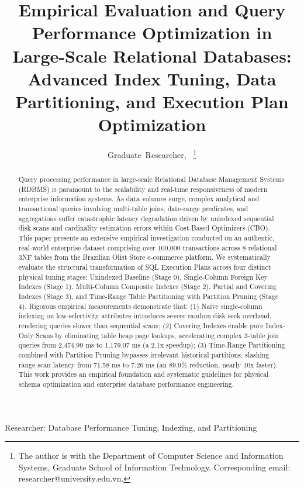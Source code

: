 \documentclass[journal]{IEEEtran}
\begin{document}
\title{Empirical Evaluation and Query Performance Optimization in Large-Scale Relational Databases: Advanced Index Tuning, Data Partitioning, and Execution Plan Optimization}

\author{Graduate~Researcher,~
\thanks{The author is with the Department of Computer Science and Information Systems, Graduate School of Information Technology. Corresponding email: researcher@university.edu.vn.}
}

%
{Researcher: Database Performance Tuning, Indexing, and Partitioning}

\maketitle

\begin{abstract}
Query processing performance in large-scale Relational Database Management Systems (RDBMS) is paramount to the scalability and real-time responsiveness of modern enterprise information systems. As data volumes surge, complex analytical and transactional queries involving multi-table joins, date-range predicates, and aggregations suffer catastrophic latency degradation driven by unindexed sequential disk scans and cardinality estimation errors within Cost-Based Optimizers (CBO). This paper presents an extensive empirical investigation conducted on an authentic, real-world enterprise dataset comprising over 100,000 transactions across 8 relational 3NF tables from the Brazilian Olist Store e-commerce platform. We systematically evaluate the structural transformation of SQL Execution Plans across four distinct physical tuning stages: Unindexed Baseline (Stage 0), Single-Column Foreign Key Indexes (Stage 1), Multi-Column Composite Indexes (Stage 2), Partial and Covering Indexes (Stage 3), and Time-Range Table Partitioning with Partition Pruning (Stage 4). Rigorous empirical measurements demonstrate that: (1) Naive single-column indexing on low-selectivity attributes introduces severe random disk seek overhead, rendering queries slower than sequential scans; (2) Covering Indexes enable pure Index-Only Scans by eliminating table heap page lookups, accelerating complex 3-table join queries from 2,474.99 ms to 1,179.07 ms (a 2.1x speedup); (3) Time-Range Partitioning combined with Partition Pruning bypasses irrelevant historical partitions, slashing range scan latency from 71.58 ms to 7.26 ms (an 89.9\% reduction, nearly 10x faster). This work provides an empirical foundation and systematic guidelines for physical schema optimization and enterprise database performance engineering.
\end{abstract}
\end{document}
